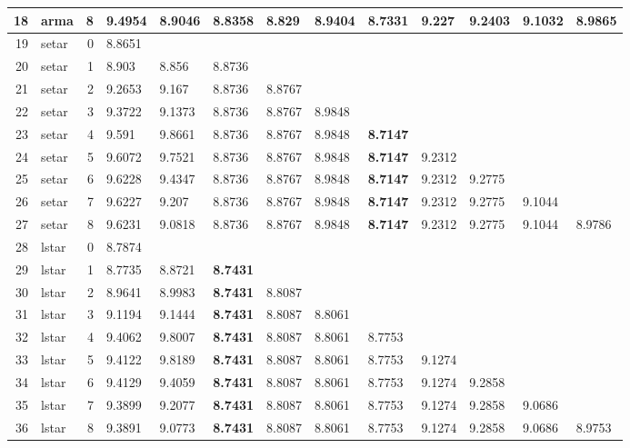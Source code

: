 \documentclass[10pt,a4paper]{article}
\begin{document}
\begin{table}[ht]
\begin{tabular}{rlrllllllllll}
  18 & arma &     8 & 9.4954 & 8.9046 & 8.8358 & 8.829 & 8.9404 & \textbf{8.7331} & 9.227 & 9.2403 & 9.1032 & 8.9865 \\ 
   \hline
19 & setar &     0 & 8.8651 &  &  &  &  &  &  &  &  &  \\ 
  20 & setar &     1 & 8.903 & 8.856 & 8.8736 &  &  &  &  &  &  &  \\ 
  21 & setar &     2 & 9.2653 & 9.167 & 8.8736 & 8.8767 &  &  &  &  &  &  \\ 
  22 & setar &     3 & 9.3722 & 9.1373 & 8.8736 & 8.8767 & 8.9848 &  &  &  &  &  \\ 
  23 & setar &     4 & 9.591 & 9.8661 & 8.8736 & 8.8767 & 8.9848 & \textbf{8.7147} &  &  &  &  \\ 
  24 & setar &     5 & 9.6072 & 9.7521 & 8.8736 & 8.8767 & 8.9848 & \textbf{8.7147} & 9.2312 &  &  &  \\ 
  25 & setar &     6 & 9.6228 & 9.4347 & 8.8736 & 8.8767 & 8.9848 & \textbf{8.7147} & 9.2312 & 9.2775 &  &  \\ 
  26 & setar &     7 & 9.6227 & 9.207 & 8.8736 & 8.8767 & 8.9848 & \textbf{8.7147} & 9.2312 & 9.2775 & 9.1044 &  \\ 
  27 & setar &     8 & 9.6231 & 9.0818 & 8.8736 & 8.8767 & 8.9848 & \textbf{8.7147} & 9.2312 & 9.2775 & 9.1044 & 8.9786 \\ 
   \hline
28 & lstar &     0 & 8.7874 &  &  &  &  &  &  &  &  &  \\ 
  29 & lstar &     1 & 8.7735 & 8.8721 & \textbf{8.7431} &  &  &  &  &  &  &  \\ 
  30 & lstar &     2 & 8.9641 & 8.9983 & \textbf{8.7431} & 8.8087 &  &  &  &  &  &  \\ 
  31 & lstar &     3 & 9.1194 & 9.1444 & \textbf{8.7431} & 8.8087 & 8.8061 &  &  &  &  &  \\ 
  32 & lstar &     4 & 9.4062 & 9.8007 & \textbf{8.7431} & 8.8087 & 8.8061 & 8.7753 &  &  &  &  \\ 
  33 & lstar &     5 & 9.4122 & 9.8189 & \textbf{8.7431} & 8.8087 & 8.8061 & 8.7753 & 9.1274 &  &  &  \\ 
  34 & lstar &     6 & 9.4129 & 9.4059 & \textbf{8.7431} & 8.8087 & 8.8061 & 8.7753 & 9.1274 & 9.2858 &  &  \\ 
  35 & lstar &     7 & 9.3899 & 9.2077 & \textbf{8.7431} & 8.8087 & 8.8061 & 8.7753 & 9.1274 & 9.2858 & 9.0686 &  \\ 
  36 & lstar &     8 & 9.3891 & 9.0773 & \textbf{8.7431} & 8.8087 & 8.8061 & 8.7753 & 9.1274 & 9.2858 & 9.0686 & 8.9753 \\ 

\end{tabular}
\end{table}
\end{document}
